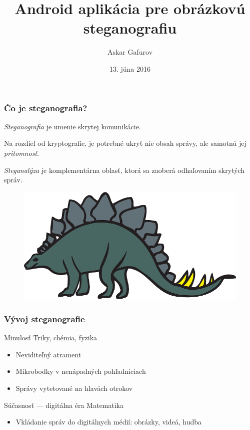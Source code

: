\documentclass{beamer}
\title[JPEG Steganografia]{Android aplikácia pre obrázkovú steganografiu} %
\author{Askar Gafurov} %
\institute[FMFI UK] %
{
Fakulta matematiky, fyziky a informatiky\\
Univerzita Komenského v Bratislave \\
\medskip
\url{ksp.sk/~askar} %
}
\date{13. júna 2016} %
\begin{document}
\begin{frame}
\titlepage %
\end{frame}


\begin{frame}
\frametitle{Čo je steganografia?}
\begin{block}{}
\textit{Steganografia} je umenie skrytej komunikácie.

Na rozdiel od kryptografie, je potrebné ukryť nie obsah správy, ale samotnú jej \textit{pritomnosť}.
\end{block}

\begin{block}{}
\textit{Steganalýza} je komplementárna oblasť, ktorá sa zaoberá odhaľovaním skrytých správ.
    
\end{block}

\begin{figure}
\includegraphics[height=0.2\textheight]{images/stegosaurus.png}
\end{figure}
\end{frame}

\begin{frame}
    \frametitle{Vývoj steganografie}
    \begin{block}{Minulosť}
        Triky, chémia, fyzika
        \begin{itemize}
            \item Neviditeľný atrament
            \item Mikrobodky v nenápadných pohľadniciach
            \item Správy vytetované na hlavách otrokov
        \end{itemize}
    \end{block}
    \begin{block}{Súčasnosť --- digitálna éra}
        Matematika
        \begin{itemize}
            \item Vkládanie správ do digitálnych médií: obrázky, videá, hudba
        \end{itemize}
    \end{block}
\end{frame}
\end{document}
